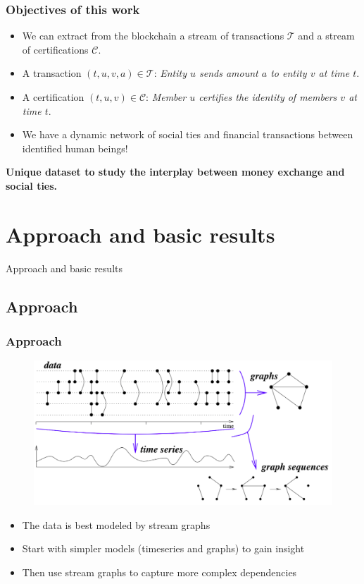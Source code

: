 \documentclass{beamer}
\begin{document}
\begin{frame}
	\frametitle{Objectives of this work}
	\begin{itemize}
		\item We can extract from the blockchain a stream of transactions $\mathcal{T}$ and a stream of certifications $\mathcal{C}$.
		\item A transaction $\left(t,u,v,a\right) \in \mathcal{T}$: \textit{Entity $u$ sends amount $a$ to entity $v$ at time $t$}.
		\item A certification $\left(t,u,v\right) \in \mathcal{C}$: \textit{Member $u$ certifies the identity of members $v$ at time $t$}.
		\item We have a dynamic network of social ties and financial transactions between identified human beings!
	\end{itemize}
	\medskip
	\textbf{Unique dataset to study the interplay between money exchange and social ties.}
\end{frame}



\section{Approach and basic results}

\begin{frame}
	\Huge{\centerline{Approach and basic results}}
\end{frame}


\subsection{Approach}

\begin{frame}
	\frametitle{Approach}
	\begin{figure}
		\includegraphics[width=.8\linewidth]{./figures/stream_graph_signal}
	\end{figure}
	\begin{itemize}
		\item The data is best modeled by stream graphs
		\item Start with simpler models (timeseries and graphs) to gain insight
		\item Then use stream graphs to capture more complex dependencies
	\end{itemize}
\end{frame}
\end{document}
